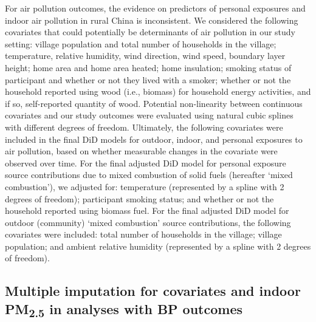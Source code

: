 \documentclass[
  letterpaper,
  DIV=11,
  numbers=noendperiod]{scrartcl}
\begin{document}
For air pollution outcomes, the evidence on predictors of personal
exposures and indoor air pollution in rural China is inconsistent. We
considered the following covariates that could potentially be
determinants of air pollution in our study setting: village population
and total number of households in the village; temperature, relative
humidity, wind direction, wind speed, boundary layer height; home area
and home area heated; home insulation; smoking status of participant and
whether or not they lived with a smoker; whether or not the household
reported using wood (i.e., biomass) for household energy activities, and
if so, self-reported quantity of wood. Potential non-linearity between
continuous covariates and our study outcomes were evaluated using
natural cubic splines with different degrees of freedom. Ultimately, the
following covariates were included in the final DiD models for outdoor,
indoor, and personal exposures to air pollution, based on whether
measurable changes in the covariate were observed over time. For the
final adjusted DiD model for personal exposure source contributions due
to mixed combustion of solid fuels (hereafter `mixed combustion'), we
adjusted for: temperature (represented by a spline with 2 degrees of
freedom); participant smoking status; and whether or not the household
reported using biomass fuel. For the final adjusted DiD model for
outdoor (community) `mixed combustion' source contributions, the
following covariates were included: total number of households in the
village; village population; and ambient relative humidity (represented
by a spline with 2 degrees of freedom).

\subsection{\texorpdfstring{Multiple imputation for covariates and
indoor PM\textsubscript{2.5} in analyses with BP
outcomes}{Multiple imputation for covariates and indoor PM2.5 in analyses with BP outcomes}}\label{multiple-imputation-for-covariates-and-indoor-pm2.5-in-analyses-with-bp-outcomes}
\end{document}
